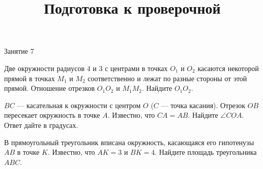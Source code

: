 \begin{class}[number=7]
	\title{Подготовка к проверочной}
	\begin{listofex}
		\item Занятие 7
	\end{listofex}
\end{class}

\begin{homework}[number=4]
	\begin{listofex}
		\item Две окружности радиусов \(4\) и \(3\) с центрами в точках \(O_1\) и \(O_2\) касаются некоторой прямой в точках \(M_1\) и \(M_2\) соответственно и лежат по разные стороны от этой прямой. Отношение отрезков \(O_1O_2\) и \(M_1M_2\). Найдите \(O_1O_2\).
		\item \(BC\) --- касательная к окружности с центром \(O\) (\(C\) --- точка касания). Отрезок \(OB\) пересекает окружность в точке \(A\). Известно, что \(CA=AB\). Найдите \( \angle COA \). Ответ дайте в градусах.
		\item В прямоугольный треугольник вписана окружность, касающаяся его гипотенузы \(AB\) в точке \(K\). Известно, что \(AK=3\) и \(BK=4\). Найдите площадь треугольника \(ABC\).
	\end{listofex}
\end{homework}

